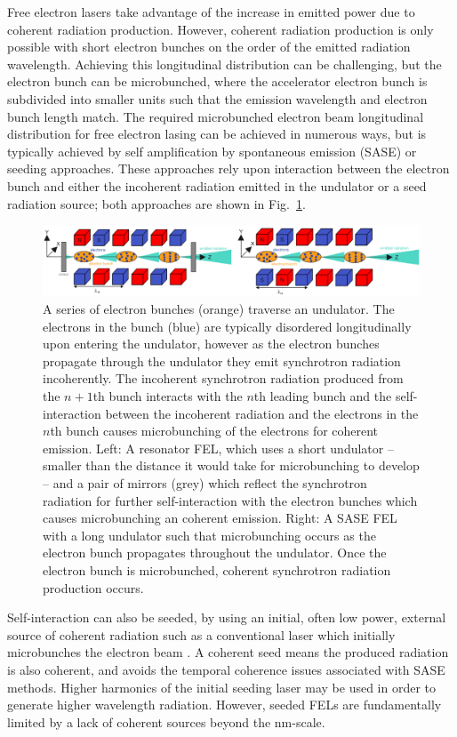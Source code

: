 \documentclass[../main.tex]{subfiles}
\begin{document}
Free electron lasers take advantage of the increase in emitted power due to coherent radiation production. However, coherent radiation production is only possible with short electron bunches on the order of the emitted radiation wavelength. Achieving this longitudinal distribution can be challenging, but the electron bunch can be microbunched, where the accelerator electron bunch is subdivided into smaller units such that the emission wavelength and electron bunch length match. The required microbunched electron beam longitudinal distribution for free electron lasing can be achieved in numerous ways, but is typically achieved by self amplification by spontaneous emission (SASE) or seeding approaches. These approaches rely upon interaction between the electron bunch and either the incoherent radiation emitted in the undulator or a seed radiation source; both approaches are shown in Fig.~\ref{fig:FEL_microbunching}.
\begin{figure}[!h]
\centering
\includegraphics[width=\textwidth]{Figures/Introduction/FELs_microbunching.pdf}
\caption{A series of electron bunches (orange) traverse an undulator. The electrons in the bunch (blue) are typically disordered longitudinally upon entering the undulator, however as the electron bunches propagate through the undulator they emit synchrotron radiation incoherently. The incoherent synchrotron radiation produced from the $n+1$th bunch interacts with the $n$th leading bunch and the self-interaction between the incoherent radiation and the electrons in the $n$th bunch causes microbunching of the electrons for coherent emission. Left: A resonator FEL, which uses a short undulator -- smaller than the distance it would take for microbunching to develop -- and a pair of mirrors (grey) which reflect the synchrotron radiation for further self-interaction with the electron bunches which causes microbunching an coherent emission. Right: A SASE FEL with a long undulator such that microbunching occurs as the electron bunch propagates throughout the undulator. Once the electron bunch is microbunched, coherent synchrotron radiation production occurs. }
\label{fig:FEL_microbunching}
\end{figure}

Self-interaction can also be seeded, by using an initial, often low power, external source of coherent radiation such as a conventional laser which initially microbunches the electron beam \cite{allaria2012highly}. A coherent seed means the produced radiation is also coherent, and avoids the temporal coherence issues associated with SASE methods. Higher harmonics of the initial seeding laser may be used in order to generate higher wavelength radiation. However, seeded FELs are fundamentally limited by a lack of coherent sources beyond the \si{\nano\meter}-scale.
\end{document}
